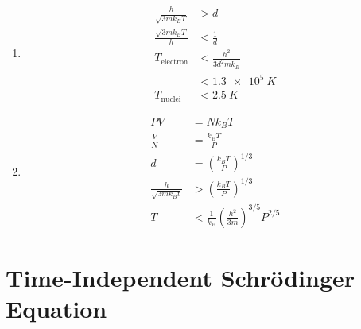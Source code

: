 \documentclass{article}
\begin{document}
\setcounter{subsection}{17}
\subsection{}

\begin{enumerate}
  \item

        \begin{align*}
          \frac{h}{\sqrt{3 m k_B T}} & > d                       \\
          \frac{\sqrt{3 m k_B T}}{h} & < \frac{1}{d}             \\
          T_\text{electron}          & < \frac{h^2}{3 d^2 m k_B} \\
                                     & < \qty{1.3e5}{K}          \\
          T_\text{nuclei}            & < \qty{2.5}{K}
        \end{align*}

  \item

        \begin{align*}
          P V                        & = N k_B T                                                        \\
          \frac{V}{N}                & = \frac{k_B T}{P}                                                \\
          d                          & = \left( \frac{k_B T}{P} \right)^{1 / 3}                         \\
          \frac{h}{\sqrt{3 m k_B t}} & > \left( \frac{k_B T}{P} \right)^{1 / 3}                         \\
          T                          & < \frac{1}{k_B} \left( \frac{h^2}{3 m} \right)^{3 / 5} P^{2 / 5}
        \end{align*}
\end{enumerate}

\section{Time-Independent Schrödinger Equation}

\subsection{}
\end{document}
